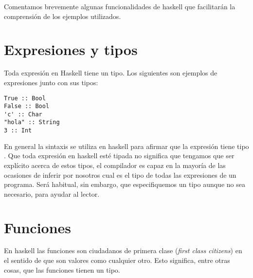 Comentamos brevemente algunas funcionalidades de haskell
que facilitarán la comprensión de los ejemplos utilizados.

\section{Expresiones y tipos}
Toda expresión en Haskell tiene un tipo. Los siguientes
son ejemplos de expresiones junto con sus tipos:
\begin{verbatim}
True :: Bool
False :: Bool
'c' :: Char
"hola" :: String
3 :: Int
\end{verbatim}
En general la sintaxis  se utiliza en haskell para
afirmar que la expresión  tiene tipo . Que toda
expresión en haskell esté tipada no significa que tengamos que
ser explícito acerca de estos tipos, el compilador es capaz
en la mayoría de las ocasiones de inferir por nosotros cual
es el tipo de todas las expresiones de un programa. Será habitual,
sin embargo, que especifiquemos un tipo aunque no sea necesario,
para ayudar al lector.

\section{Funciones}
En haskell las funciones son ciudadanos de primera clase
(\textit{first class citizens}) en el sentido de que son valores
como cualquier otro. Esto significa, entre otras cosas, que las
funciones tienen un tipo.

